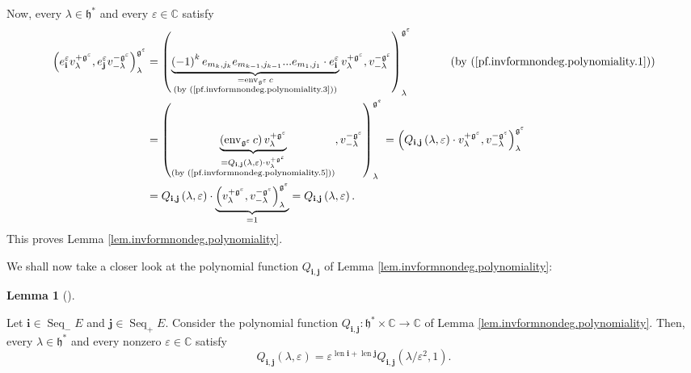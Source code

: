 \documentclass
[numbers=enddot,12pt,final,onecolumn,german,notitlepage]{scrartcl}%
\theoremstyle{definition}
\newtheorem{lem}[theo]{Lemma}
\newenvironment{lemma}[1][]
{\begin{lem}[#1]\begin{leftbar}}
{\end{leftbar}\end{lem}}
\begin{document}
Now, every $\lambda\in\mathfrak{h}^{\ast}$ and every $\varepsilon\in
\mathbb{C}$ satisfy%
\begin{align*}
\left(  e_{\mathbf{i}}^{\varepsilon}v_{\lambda}^{+\mathfrak{g}^{\varepsilon}%
},e_{\mathbf{j}}^{\varepsilon}v_{-\lambda}^{-\mathfrak{g}^{\varepsilon}%
}\right)  _{\lambda}^{\mathfrak{g}^{\varepsilon}}  &  =\left(
\underbrace{\left(  -1\right)  ^{k}e_{m_{k},j_{k}}e_{m_{k-1},j_{k-1}%
}...e_{m_{1},j_{1}}\cdot e_{\mathbf{i}}^{\varepsilon}}%
_{\substack{=\operatorname*{env}\nolimits_{\mathfrak{g}^{\varepsilon}%
}c\\\text{(by (\ref{pf.invformnondeg.polynomiality.3}))}}}v_{\lambda
}^{+\mathfrak{g}^{\varepsilon}},v_{-\lambda}^{-\mathfrak{g}^{\varepsilon}%
}\right)  _{\lambda}^{\mathfrak{g}^{\varepsilon}}\ \ \ \ \ \ \ \ \ \ \left(
\text{by (\ref{pf.invformnondeg.polynomiality.1})}\right) \\
&  =\left(  \underbrace{\left(  \operatorname*{env}\nolimits_{\mathfrak{g}%
^{\varepsilon}}c\right)  v_{\lambda}^{+\mathfrak{g}^{\varepsilon}}%
}_{\substack{=Q_{\mathbf{i},\mathbf{j}}\left(  \lambda,\varepsilon\right)
\cdot v_{\lambda}^{+\mathfrak{g}^{\varepsilon}}\\\text{(by
(\ref{pf.invformnondeg.polynomiality.5}))}}},v_{-\lambda}^{-\mathfrak{g}%
^{\varepsilon}}\right)  _{\lambda}^{\mathfrak{g}^{\varepsilon}}=\left(
Q_{\mathbf{i},\mathbf{j}}\left(  \lambda,\varepsilon\right)  \cdot v_{\lambda
}^{+\mathfrak{g}^{\varepsilon}},v_{-\lambda}^{-\mathfrak{g}^{\varepsilon}%
}\right)  _{\lambda}^{\mathfrak{g}^{\varepsilon}}\\
&  =Q_{\mathbf{i},\mathbf{j}}\left(  \lambda,\varepsilon\right)
\cdot\underbrace{\left(  v_{\lambda}^{+\mathfrak{g}^{\varepsilon}}%
,v_{-\lambda}^{-\mathfrak{g}^{\varepsilon}}\right)  _{\lambda}^{\mathfrak{g}%
^{\varepsilon}}}_{=1}=Q_{\mathbf{i},\mathbf{j}}\left(  \lambda,\varepsilon
\right)  .
\end{align*}
This proves Lemma \ref{lem.invformnondeg.polynomiality}.

We shall now take a closer look at the polynomial function $Q_{\mathbf{i}%
,\mathbf{j}}$ of Lemma \ref{lem.invformnondeg.polynomiality}:

\begin{lemma}
\label{lem.invformnondeg.polynomiality3}Let $\mathbf{i}\in\operatorname*{Seq}%
\nolimits_{-}E$ and $\mathbf{j}\in\operatorname*{Seq}\nolimits_{+}E$. Consider
the polynomial function $Q_{\mathbf{i},\mathbf{j}}:\mathfrak{h}^{\ast}%
\times\mathbb{C}\rightarrow\mathbb{C}$ of Lemma
\ref{lem.invformnondeg.polynomiality}. Then, every $\lambda\in\mathfrak{h}%
^{\ast}$ and every nonzero $\varepsilon\in\mathbb{C}$ satisfy%
\[
Q_{\mathbf{i},\mathbf{j}}\left(  \lambda,\varepsilon\right)  =\varepsilon
^{\operatorname*{len}\mathbf{i}+\operatorname*{len}\mathbf{j}}Q_{\mathbf{i}%
,\mathbf{j}}\left(  \lambda/\varepsilon^{2},1\right)  .
\]

\end{lemma}
\end{document}
